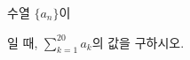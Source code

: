 수열 $\{a_n\}$이\par\smallskip{}\par\smallskip\noindent 일 때, $\displaystyle\sum_{k=1}^{20} a_k$의 값을 구하시오.
